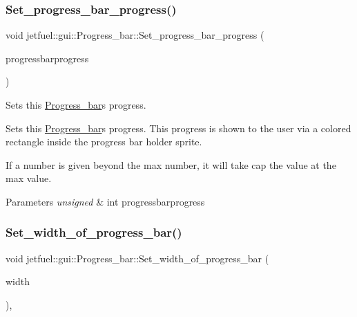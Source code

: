 \subsubsection{\texorpdfstring{Set\+\_\+progress\+\_\+bar\+\_\+progress()}{Set\_progress\_bar\_progress()}}
{\footnotesize\ttfamily void jetfuel\+::gui\+::\+Progress\+\_\+bar\+::\+Set\+\_\+progress\+\_\+bar\+\_\+progress (\begin{DoxyParamCaption}\item[{const unsigned int}]{progressbarprogress }\end{DoxyParamCaption})\hspace{0.3cm}{\ttfamily [inline]}}



Sets this \hyperlink{classjetfuel_1_1gui_1_1Progress__bar}{Progress\+\_\+bar}\textquotesingle{}s progress. 

Sets this \hyperlink{classjetfuel_1_1gui_1_1Progress__bar}{Progress\+\_\+bar}\textquotesingle{}s progress. This progress is shown to the user via a colored rectangle inside the progress bar holder sprite.

If a number is given beyond the max number, it will take cap the value at the max value.


\begin{DoxyParams}{Parameters}
{\em unsigned} & int progressbarprogress \\
\hline
\end{DoxyParams}
\mbox{\label{classjetfuel_1_1gui_1_1Progress__bar_a5975a20358c54bc05d87d4285cefe990}} 
\subsubsection{\texorpdfstring{Set\+\_\+width\+\_\+of\+\_\+progress\+\_\+bar()}{Set\_width\_of\_progress\_bar()}}
{\footnotesize\ttfamily void jetfuel\+::gui\+::\+Progress\+\_\+bar\+::\+Set\+\_\+width\+\_\+of\+\_\+progress\+\_\+bar (\begin{DoxyParamCaption}\item[{const int}]{width }\end{DoxyParamCaption})\hspace{0.3cm}{\ttfamily [inline]}, {\ttfamily [protected]}}



